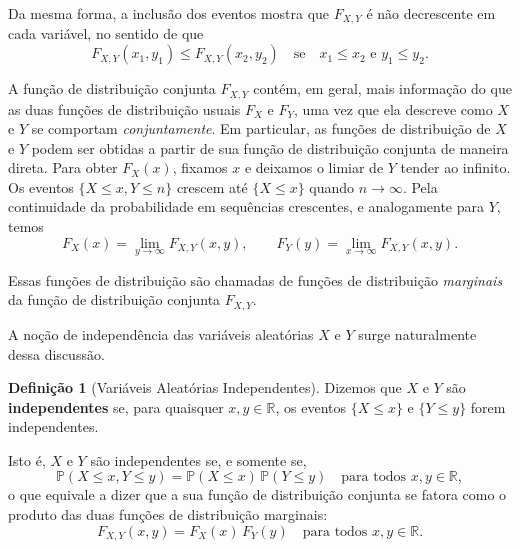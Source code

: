 \documentclass[12pt,portuguese]{article}
\theoremstyle{definition}
\newtheorem{definition}[definition]{Definição}
\theoremstyle{plainexercise}
\theoremstyle{starredexercise}
\theoremstyle{definition}
\begin{document}
Da mesma forma, a inclusão dos eventos mostra que $F_{X,Y}$ é
não decrescente em cada variável, no sentido de que
\begin{equation}
\label{eq:monotonicidade-distribuicao-conjunta}
  F_{X,Y}(x_1, y_1) \leqslant F_{X,Y}(x_2, y_2)
  \quad \text{se} \quad x_1 \leqslant x_2 \text{ e } y_1 \leqslant y_2.
\end{equation}

A função de distribuição conjunta $F_{X,Y}$ contém, em geral, mais informação
do que as duas funções de distribuição usuais $F_X$ e $F_Y$, uma vez que
ela descreve como $X$ e $Y$ se comportam \emph{conjuntamente}. Em
particular, as funções de distribuição de $X$ e $Y$ podem ser obtidas a
partir de sua função de distribuição conjunta de maneira direta.
Para obter $F_X(x)$, fixamos $x$ e deixamos o limiar de $Y$ tender ao
infinito. Os eventos $\{X \leqslant x, Y \leqslant n\}$ crescem até
$\{X \leqslant x\}$ quando $n \to \infty$. Pela continuidade da
probabilidade em sequências crescentes, e analogamente para $Y$, temos
\begin{equation}
\label{eq:distribuicoes-marginais-limites}
  F_X(x) = \lim_{y \to \infty} F_{X,Y}(x, y),
  \qquad
  F_Y(y) = \lim_{x \to \infty} F_{X,Y}(x, y).
\end{equation}

Essas funções de distribuição são chamadas de funções de distribuição
\emph{marginais} da função de distribuição conjunta $F_{X,Y}$.

A noção de independência das variáveis aleatórias $X$ e $Y$ surge
naturalmente dessa discussão.

\begin{definition}[Variáveis Aleatórias Independentes]\label{def:variaveis-aleatorias-independentes}
  Dizemos que $X$ e $Y$ são \textbf{independentes} se, para quaisquer $x, y \in
  \mathbb{R}$, os eventos $\{X \leqslant x\}$ e $\{Y \leqslant y\}$ forem
  independentes.
\end{definition}

Isto é, $X$ e $Y$ são independentes se, e somente se,
\[
  \mathbb{P}(X \leqslant x, Y \leqslant y)
  = \mathbb{P}(X \leqslant x)\,\mathbb{P}(Y \leqslant y)
  \quad \text{para todos } x, y \in \mathbb{R},
\]
o que equivale a dizer que a sua função de distribuição conjunta se fatora
como o produto das duas funções de distribuição marginais:
\begin{equation}
\label{eq:fatoracao-distribuicao-conjunta}
  F_{X,Y}(x, y) = F_X(x)\,F_Y(y)
  \quad \text{para todos } x, y \in \mathbb{R}.
\end{equation}
\end{document}
